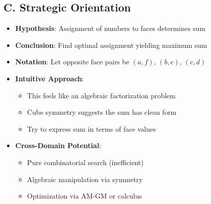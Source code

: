 \documentclass[]{article}
\begin{document}
\begin{problemconfigbox}
\subsection*{C. Strategic Orientation}
\begin{itemize}[leftmargin=*]
    \item \textbf{Hypothesis}: Assignment of numbers to faces determines sum
    \item \textbf{Conclusion}: Find optimal assignment yielding maximum sum
    \item \textbf{Notation}: Let opposite face pairs be $(a,f)$, $(b,e)$, $(c,d)$
    \item \textbf{Intuitive Approach}: 
    \begin{itemize}
        \item This feels like an algebraic factorization problem
        \item Cube symmetry suggests the sum has clean form
        \item Try to express sum in terms of face values
    \end{itemize}
    \item \textbf{Cross-Domain Potential}: 
    \begin{itemize}
        \item Pure combinatorial search (inefficient)
        \item Algebraic manipulation via symmetry
        \item Optimization via AM-GM or calculus
    \end{itemize}
\end{itemize}
\end{problemconfigbox}
\end{document}
